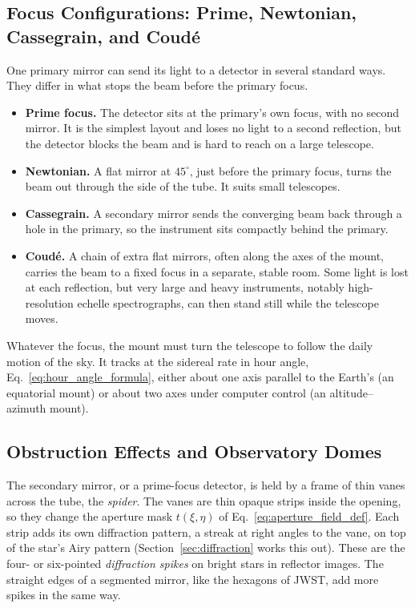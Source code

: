 \subsection{Focus Configurations: Prime, Newtonian, Cassegrain, and Coud\'e}

One primary mirror can send its light to a detector in several standard ways. They differ in what stops the beam before the primary focus.
\begin{itemize}
	\item \textbf{Prime focus.} The detector sits at the primary's own focus, with no second mirror. It is the simplest layout and loses no light to a second reflection, but the detector blocks the beam and is hard to reach on a large telescope.
	\item \textbf{Newtonian.} A flat mirror at $45^\circ$, just before the primary focus, turns the beam out through the side of the tube. It suits small telescopes.
	\item \textbf{Cassegrain.} A secondary mirror sends the converging beam back through a hole in the primary, so the instrument sits compactly behind the primary.
	\item \textbf{Coud\'e.} A chain of extra flat mirrors, often along the axes of the mount, carries the beam to a fixed focus in a separate, stable room. Some light is lost at each reflection, but very large and heavy instruments, notably high-resolution echelle spectrographs, can then stand still while the telescope moves.
\end{itemize}
Whatever the focus, the mount must turn the telescope to follow the daily motion of the sky. It tracks at the sidereal rate in hour angle, Eq.~\eqref{eq:hour_angle_formula}, either about one axis parallel to the Earth's (an equatorial mount) or about two axes under computer control (an altitude--azimuth mount).

\subsection{Obstruction Effects and Observatory Domes}
\label{sec:spiders_domes}

The secondary mirror, or a prime-focus detector, is held by a frame of thin vanes across the tube, the \emph{spider}. The vanes are thin opaque strips inside the opening, so they change the aperture mask $t(\xi,\eta)$ of Eq.~\eqref{eq:aperture_field_def}. Each strip adds its own diffraction pattern, a streak at right angles to the vane, on top of the star's Airy pattern (Section~\ref{sec:diffraction} works this out). These are the four- or six-pointed \emph{diffraction spikes} on bright stars in reflector images. The straight edges of a segmented mirror, like the hexagons of JWST, add more spikes in the same way.

